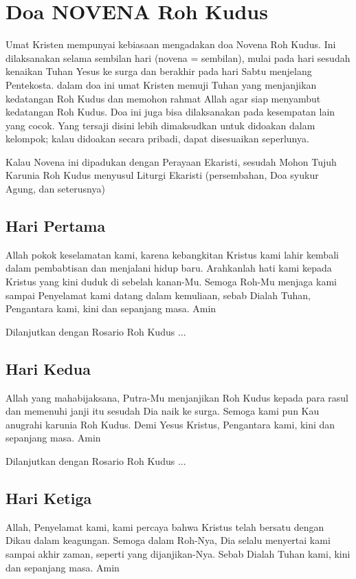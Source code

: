 \section[Doa NOVENA Roh Kudus]{Doa NOVENA Roh Kudus}
Umat Kristen mempunyai kebiasaan mengadakan doa Novena Roh Kudus. Ini
dilaksanakan selama sembilan hari (novena = sembilan), mulai pada hari
sesudah kenaikan Tuhan Yesus ke surga dan berakhir pada hari Sabtu
menjelang Pentekosta. dalam doa ini umat Kristen memuji Tuhan yang
menjanjikan kedatangan Roh Kudus dan memohon rahmat Allah agar siap
menyambut kedatangan Roh Kudus. Doa ini juga bisa dilaksanakan pada
kesempatan lain yang cocok. Yang tersaji disini lebih dimaksudkan untuk
didoakan dalam kelompok; kalau didoakan secara pribadi, dapat
disesuaikan seperlunya.

Kalau Novena ini dipadukan dengan Perayaan Ekaristi, sesudah Mohon Tujuh
Karunia Roh Kudus menyusul Liturgi Ekaristi (persembahan, Doa syukur
Agung, dan seterusnya)

\subsection*{Hari Pertama}
Allah pokok keselamatan kami, karena kebangkitan Kristus kami lahir
kembali dalam pembabtisan dan menjalani hidup baru. Arahkanlah hati
kami kepada Kristus yang kini duduk di sebelah kanan-Mu. Semoga Roh-Mu
menjaga kami sampai Penyelamat kami datang dalam kemuliaan, sebab
Dialah Tuhan, Pengantara kami, kini dan sepanjang masa. Amin

Dilanjutkan dengan Rosario Roh Kudus ...

\subsection*{Hari Kedua}
Allah yang mahabijaksana, Putra-Mu menjanjikan Roh Kudus kepada para
rasul dan memenuhi janji itu sesudah Dia naik ke surga. Semoga kami pun
Kau anugrahi karunia Roh Kudus. Demi Yesus Kristus, Pengantara kami,
kini dan sepanjang masa. Amin

Dilanjutkan dengan Rosario Roh Kudus ...

\subsection*{Hari Ketiga}
Allah, Penyelamat kami, kami percaya bahwa Kristus telah bersatu dengan
Dikau dalam keagungan. Semoga dalam Roh-Nya, Dia selalu menyertai kami
sampai akhir zaman, seperti yang dijanjikan-Nya. Sebab Dialah Tuhan
kami, kini dan sepanjang masa. Amin

